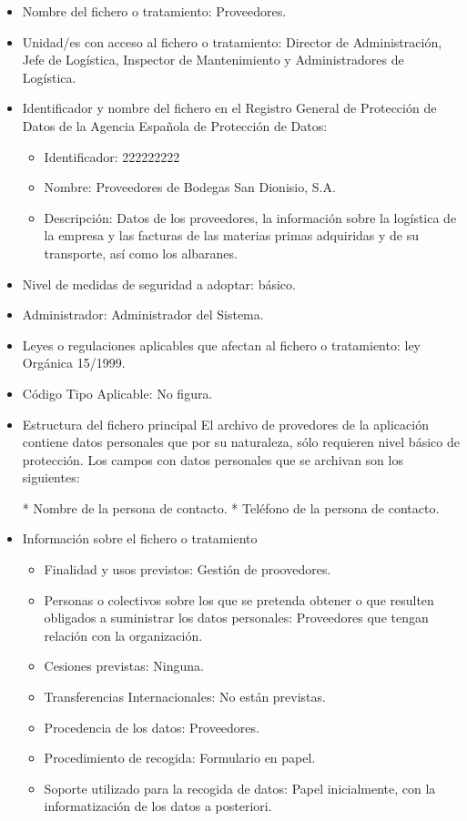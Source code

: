 \documentclass[a4paper,11pt,bibtotoc,noliststotoc]{scrbook}
\newcommand{\laorganizacion}{Bodegas San Dionisio, S.A.}
\begin{document}
\begin{itemize}
\item Nombre del fichero o tratamiento: Proveedores.

\item Unidad/es con acceso al fichero o tratamiento: Director de Administración, Jefe de Logística, Inspector de Mantenimiento y Administradores de Logística.

\item Identificador y nombre del fichero en el Registro General de Protección de Datos de la Agencia Española de Protección de Datos: 
	\begin{itemize}
	\item Identificador: 222222222
	\item Nombre: Proveedores de \laorganizacion
	\item Descripción: Datos de los proveedores, la información sobre la logística de la empresa y las facturas de las materias primas adquiridas y de su transporte, así como los albaranes.
	\end{itemize}

\item Nivel de medidas de seguridad a adoptar: básico.

\item Administrador: Administrador del Sistema.

\item Leyes o regulaciones aplicables que afectan al fichero o tratamiento: ley Orgánica 15/1999.

\item Código Tipo Aplicable: No figura.

\item Estructura del fichero principal
El archivo de provedores de la aplicación contiene datos personales que por su naturaleza, sólo requieren nivel básico de protección. Los campos con datos personales que se archivan son los siguientes:

* Nombre de la persona de contacto.
* Teléfono de la persona de contacto.


\item Información sobre el fichero o tratamiento
	\begin{itemize}
	\item Finalidad y usos previstos: Gestión de proovedores.
	\item Personas o colectivos sobre los que se pretenda obtener o que resulten obligados a suministrar los datos personales: Proveedores que tengan relación con la organización.
	\item Cesiones previstas: Ninguna.
	\item Transferencias Internacionales: No están previstas.
	\item Procedencia de los datos: Proveedores.
	\item Procedimiento de recogida: Formulario en papel.
	\item Soporte utilizado para la recogida de datos: Papel inicialmente, con la informatización de los datos a posteriori.
	\end{itemize}


\end{itemize}
\end{document}
